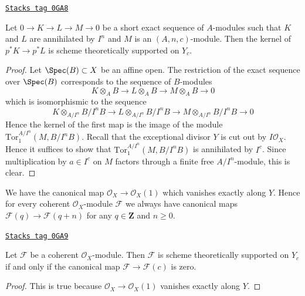 \begin{lemma}
\label{local-cohomology-lemma-almost-exactness}
\href{https://stacks.math.columbia.edu/tag/0GA8}{\texttt{Stacks tag 0GA8}}

Let $0 \to K \to L \to M \to 0$ be a short exact sequence of $A$-modules
such that $K$ and $L$ are annihilated by $I^n$ and $M$ is an
$(A, n, c)$-module. Then the kernel of $p^*K \to p^*L$
is scheme theoretically supported on $Y_c$.
\end{lemma}

\begin{proof}
Let $\Spec(B) \subset X$ be an affine open. The restriction of the exact
sequence over $\Spec(B)$ corresponds to the sequence of $B$-modules
$$
K \otimes_A B \to L \otimes_A B \to M \otimes_A B \to 0
$$
which is isomorphismic to the sequence
$$
K \otimes_{A/I^n} B/I^nB \to
L \otimes_{A/I^n} B/I^nB \to
M \otimes_{A/I^n} B/I^nB \to 0
$$
Hence the kernel of the first map is the image of the module
$\text{Tor}_1^{A/I^n}(M, B/I^nB)$. Recall that the exceptional
divisor $Y$ is cut out by $I\mathcal{O}_X$.
Hence it suffices to show that
$\text{Tor}_1^{A/I^n}(M, B/I^nB)$ is annihilated by $I^c$. Since
multiplication by $a \in I^c$ on $M$ factors through a finite
free $A/I^n$-module, this is clear.
\end{proof}

We have the canonical map $\mathcal{O}_X \to \mathcal{O}_X(1)$
which vanishes exactly along $Y$.
Hence for every coherent $\mathcal{O}_X$-module $\mathcal{F}$
we always have canonical maps
$\mathcal{F}(q) \to \mathcal{F}(q + n)$ for any $q \in \mathbf{Z}$
and $n \geq 0$.

\begin{lemma}[Annihilated]
\label{local-cohomology-lemma-annihilated}
\href{https://stacks.math.columbia.edu/tag/0GA9}{\texttt{Stacks tag 0GA9}}

Let $\mathcal{F}$ be a coherent $\mathcal{O}_X$-module.
Then $\mathcal{F}$ is scheme theoretically
supported on $Y_c$ if and only if the canonical map
$\mathcal{F} \to \mathcal{F}(c)$ is zero.
\end{lemma}

\begin{proof}
This is true because $\mathcal{O}_X \to \mathcal{O}_X(1)$
vanishes exactly along $Y$.
\end{proof}

